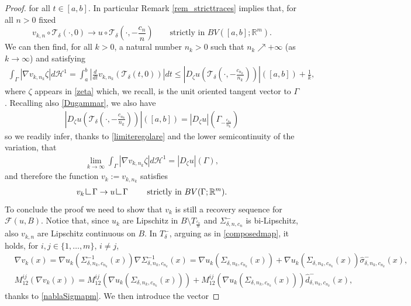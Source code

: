\documentclass[a4paper,11pt]{article}
\numberwithin{equation}{section}
\newcommand{\R}{\mathbb{R}}
\newcommand{\res}      {\mathop{\hbox{\vrule height 7pt width .5pt depth
                        0pt\vrule height .5pt width 6pt depth 0pt}}\nolimits}
\begin{document}
\begin{proof}
for all $t\in [a,b]$. In particular Remark \ref{rem_stricttraces} implies that, for all $n>0$ fixed
$$v_{k,n}\circ\mathcal T_\delta(\cdot,0)\rightarrow u\circ\mathcal T_\delta(\cdot,-\frac{c_n}{n}) \qquad \text{strictly in }BV([a,b];\R^m).$$
We can then find, for all $k>0$, a natural number $n_k>0$ such that $n_k\nearrow+\infty$ (as $k\rightarrow\infty$) and  satisfying
\begin{align*}
	\int_{\Gamma}|\nabla v_{k,n_k}\zeta|d\mathcal H^1=
\int_a^b|\frac{d}{dt}v_{k,n_k}(\mathcal T_\delta(t,0))|dt\leq |D_\zeta u(\mathcal T_\delta(\cdot,-\frac{c_{n_k}}{n_k}))|([a,b])+\frac1k,
\end{align*}
where $\zeta$ appears in \eqref{zeta} which, we recall, is the unit oriented tangent vector to $\Gamma$.
Recalling also \eqref{Dugammar}, we also have
 \begin{align*}
|D_\zeta u(\mathcal T_\delta(\cdot,-\frac{c_{n_k}}{n_k}))|([a,b])=|D_\zeta u|(\Gamma_{-\frac{c_{n_k}}{n_k}})
 \end{align*}
so we readily infer, thanks to \eqref{limiteregolare} and the lower semicontinuity of the variation, that 
\begin{align*}
\lim_{k\rightarrow\infty}	\int_{\Gamma}|\nabla v_{k,n_k}\zeta|d\mathcal H^1=|D_\zeta u|(\Gamma),
\end{align*}
and therefore the function $v_k:=v_{k,n_k}$ satisfies
\begin{align*}
	v_k\res\Gamma\rightarrow u\res \Gamma\qquad \text{ strictly in } BV(\Gamma;\R^m).
\end{align*}
To conclude the proof we need to show that $v_k$ is still a recovery sequence for $\mathcal F(u,B)$. Notice that, since $u_k$ are Lipschitz in $B\setminus T_{\frac{c_n}{n}}$ and $\Sigma^-_{\delta,n,c_n}$ is bi-Lipschitz, also $v_{k,n}$ are Lipschitz continuous on $B$. In $T_\delta^-$, arguing as in \eqref{composedmap}, it holds, for $i,j\in \{1,\dots,m\}$, $i\neq j$,
\begin{align}\label{adesso}
	&\nabla v_k(x)= \nabla u_k(\Sigma_{\delta,n_k,c_{n_k}}^{-1}(x))\nabla\Sigma_{\delta,n_k,c_{n_k}}^{-1}(x)=\nabla u_k(\Sigma_{\delta,n_k,c_{n_k}}(x))+\nabla u_k(\Sigma_{\delta,n_k,c_{n_k}}(x))\widehat \sigma^-_{\delta,n_k,c_{n_k}}(x),\nonumber\\
	&M^{ij}_{12}(\nabla v_k(x))=M^{ij}_{12}(\nabla u_k(\Sigma_{\delta,n_k,c_{n_k}}(x)))+M^{ij}_{12}(\nabla u_k(\Sigma_{\delta,n_k,c_{n_k}}(x)))\widehat d^-_{\delta,n_k,c_{n_k}}(x),
\end{align}
thanks to \eqref{nablaSigmapm}.
We then introduce the vector 

\end{proof}
\end{document}
